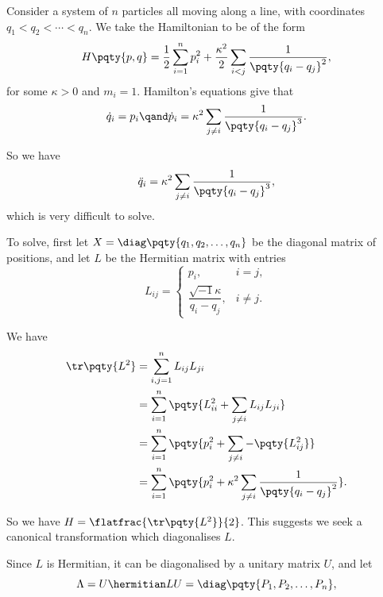 \begin{example}
    Consider a system of \(n\) particles all moving along a line, with coordinates \(q_1 < q_2 < \cdots < q_n\). We take the Hamiltonian to be of the form
    \begin{equation}
        H\pqty{p, q} = \frac{1}{2} \sum_{i = 1}^n p_i^2 + \frac{\kappa^2}{2} \sum_{i < j} \frac{1}{\pqty{q_i - q_j}^2},
    \end{equation}
    for some \(\kappa > 0\) and \(m_i = 1\). Hamilton's equations give that
    \begin{equation}
        \dot{q}_i = p_i \qand \dot{p}_i = \kappa^2 \sum_{j \neq i} \frac{1}{\pqty{q_i - q_j}^3}.
    \end{equation}

    So we have
    \begin{equation}
        \ddot{q}_i = \kappa^2 \sum_{j \neq i} \frac{1}{\pqty{q_i - q_j}^3},
    \end{equation}
    which is very difficult to solve.

    To solve, first let \(X = \diag\pqty{q_1, q_2, \ldots, q_n}\) be the diagonal matrix of positions, and let \(L\) be the Hermitian matrix with entries
    \begin{equation}
        L_{ij} = \begin{cases}
            p_i, & i = j, \\
            \dfrac{\sqrt{-1} \kappa}{q_i - q_j}, & i \neq j.
        \end{cases}
    \end{equation}

    We have
    \begin{subequations}
        \begin{align}
            \tr\pqty{L^2} &= \sum_{i, j = 1}^{n} L_{ij} L_{ji} \\
            &= \sum_{i = 1}^{n} \pqty{L_{ii}^2 + \sum_{j \neq i} L_{ij} L_{ji}} \\
            &= \sum_{i = 1}^{n} \pqty{p_i^2 + \sum_{j \neq i} -\pqty{L_{ij}^2}} \\
            &= \sum_{i = 1}^{n} \pqty{p_i^2 + \kappa^2 \sum_{j \neq i} \frac{1}{\pqty{q_i - q_j}^2}}.
        \end{align}
    \end{subequations}

    So we have \(H = \flatfrac{\tr\pqty{L^2}}{2}\). This suggests we seek a canonical transformation which diagonalises \(L\).

    Since \(L\) is Hermitian, it can be diagonalised by a unitary matrix \(U\), and let
    \begin{equation}
        \Lambda = U\hermitian L U = \diag\pqty{P_1, P_2, \ldots, P_n},
    \end{equation}


\end{example}
